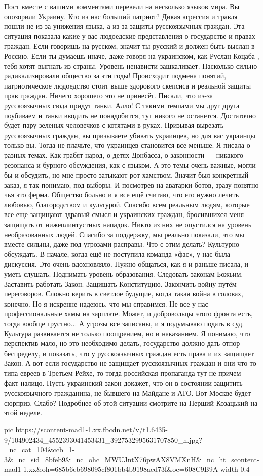 Пост вместе с вашими комментами перевели на несколько языков мира. Вы опозорили Украину. Кто из нас больший патриот?
Дикая агрессия и травля пошли не из-за унижения языка, а из-за защиты русскоязычных граждан. 
Эта ситуация показала какие у вас людоедские представления о государстве и правах граждан. Если говоришь на русском, значит ты русский и должен быть выслан в Россию. Если ты думаешь иначе, даже говоря на украинском, как Руслан Коцаба
, тебя хотят выгнать из страны. 
Уровень ненависти зашкаливает. Насколько сильно радикализировали общество за эти годы! Происходит подмена понятий, патриотическое людоедство стоит выше здорового скепсиса и реальной защиты прав граждан. 
Ничего хорошего это не принесёт. 
Писали, что из-за русскоязычных сюда придут танки. Алло! С такими темпами мы друг друга поубиваем и танки вводить не понадобится, тут никого не останется. Достаточно будет пару зеленых человечков с котятами в руках. 
Призывая вырезать русскоязычных граждан, вы призываете убивать украинцев, но для вас украинцы только вы. Тогда не плачьте, что украинцев становится все меньше.
Я писала о разных темах. Как грабят народ, о детях Донбасса, о законности — никакого резонанса и бурного обсуждения, как с языком. А это темы очень важные, могли бы и обсудить, но мне просто затыкают рот хамством. 
Значит был конкретный заказ, я так понимаю, под выборы. И посмотрев на аватарки ботов, зразу понятно чья это ферма.
Общество больно и я все ещё считаю, что его нужно лечить любовью, благородством и культурой.
Спасибо всем реальным людям, которые все еще защищают здравый смысл и украинских граждан, бросившихся меня защищать от нижеплинтустных нападок. Никто из них не опустился на уровень необразованных людей. Спасибо за поддержку, мы реально показали, что мы вместе сильны, даже под угрозами расправы.
Что с этим делать?
Культурно обсуждать.
В начале, когда ещё не поступила команда «фас», у нас была дискуссия. Это очень вдохновляло. Нужно общаться, как я и раньше писала, и уметь слушать.
Поднимать уровень образования.
Следовать законам Божьим.
Заставить работать Закон. 
Защищать Конституцию.
Закончить войну путём переговоров.
Сложно верить в светлое будущие, когда такая война в головах, конечно. Но я искренне надеюсь, что мы справимся. Не все у нас профессиональные хамы на зарплате. Может, и добровольцы этого фронта есть, тогда вообще грустно...
А угрозы все записаны, и я подумываю подать в суд. Культура развивается не только поощрением, но и наказанием. 
Я понимаю, что перспектив мало, но это необходимо делать, государство должно дать отпор беспределу, и показать, что у русскоязычных граждан есть права и их защищает Закон. А вот если государство не защищает русскоязычных граждан и они что-то типа евреев в Третьем Рейхе, то тогда российская пропаганда тут не причем – факт налицо. Пусть украинский закон докажет, что он в состоянии защитить русскоязычного гражданина, не бывшего на Майдане и АТО. Вот Москве будет сюрприз. Слабо?
Подробнее об этой ситуации смотрите на Перший Козацький
 на этой неделе.

 \ifcmt
   pic https://scontent-mad1-1.xx.fbcdn.net/v/t1.6435-9/104902434_4552393041453431_3927532995631707850_n.jpg?_nc_cat=104&ccb=1-3&_nc_sid=8bfeb9&_nc_ohc=MWUJntX76pwAX8VMXnH&_nc_ht=scontent-mad1-1.xx&oh=685b6eb698095cf801bb4b9198aed73f&oe=608C9B9A
   width 0.4
 \fi
 
